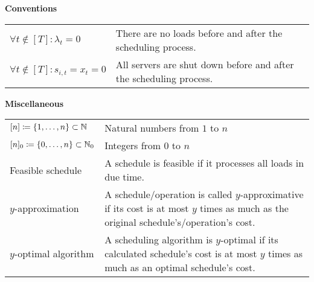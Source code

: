 \large{\textbf{Conventions}}
\begin{longtable}{p{} p{}}
  $\forall t\notin[T]:\lambda_t=0$ & There are no loads before and after the scheduling process.\\  
  $\forall t\notin[T]:s_{i,t}=x_t=0$ & All servers are shut down before and after the scheduling process.
\end{longtable}
\large{\textbf{Miscellaneous}}
\begin{longtable}{p{} p{}}
  $[n]\coloneqq\{1,\dotsc,n\}\subset\mathbb{N}$&Natural numbers from $1$ to $n$\\
  $[n]_0\coloneqq\{0,\dotsc,n\}\subset\mathbb{N}_0$&Integers from $0$ to $n$\\
  Feasible schedule&A schedule is feasible if it processes all loads in due time.\\
  $y$-approximation&A schedule/operation is called $y$-approximative if its cost is at most $y$ times as much as the original schedule's/operation's cost.\\
  $y$-optimal algorithm&A scheduling algorithm is $y$-optimal if its calculated schedule's cost is at most $y$ times as much as an optimal schedule's cost.
\end{longtable}
\egroup
